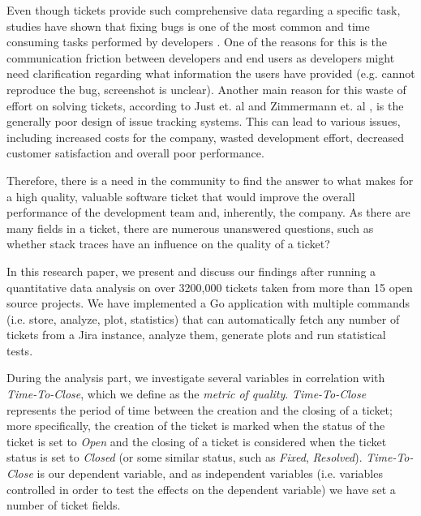 \documentclass{mpaper}
\begin{document}
Even though tickets provide such comprehensive data regarding a specific task, studies have shown 
that fixing bugs is one of the most common and time consuming tasks performed by developers \cite{latoza2006maintaining}. One of
the reasons for this is the communication friction between developers and end users \cite{Korkala2014WasteIdentification}
as developers might need clarification regarding what information the users have provided (e.g. cannot reproduce the bug, 
screenshot is unclear). Another main reason for this waste of effort on solving tickets, according to 
Just et. al \cite{just2008towards} and Zimmermann et. al \cite{zimmermann2009improving}, is the generally poor design of issue 
tracking systems. This can lead to various issues, including increased costs for the company, wasted development effort, 
decreased customer satisfaction and overall poor performance.

Therefore, there is a need in the community to find the answer to what makes for a high quality, valuable software ticket 
that would improve the overall performance of the development team and, inherently, the company. As there are many 
fields in a ticket, there are numerous unanswered questions, such as whether stack traces have an influence on the quality
of a ticket? 

In this research paper, we present and discuss our findings after running a quantitative data analysis 
on over 3200,000 tickets taken from more than 15 open source projects. We have implemented a Go application 
with multiple commands (i.e. store, analyze, plot, statistics) that can automatically fetch any number of tickets 
from a Jira instance, analyze them, generate plots and run statistical tests. 

During the analysis part, we investigate several variables in correlation with \emph{Time-To-Close}, 
which we define as the \emph{metric of quality}. \emph{Time-To-Close} represents the period of time between the creation 
and the closing of a ticket; more specifically, the creation of the ticket is marked when the status of the ticket is set to 
\emph{Open} and the closing of a ticket is considered when the ticket status is set to \emph{Closed} (or some similar status, 
such as \emph{Fixed}, \emph{Resolved}). \emph{Time-To-Close} is our dependent variable, and as independent variables 
(i.e. variables controlled in order to test the effects on the dependent variable) we have set a number of ticket fields. 
\end{document}
